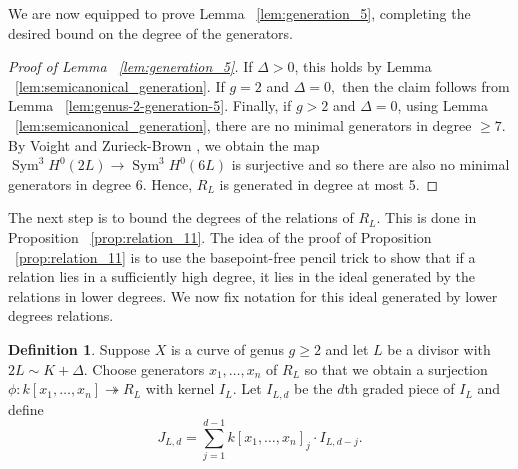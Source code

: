 \documentclass{amsart}
\theoremstyle{plain}
\theoremstyle{definition}
\newtheorem{defn}[thm]{Definition}
\theoremstyle{remark}
\numberwithin{equation}{section}
\DeclareMathOperator{\sym}{Sym}
\begin{document}
We are now equipped to prove Lemma ~\ref{lem:generation_5}, completing the desired bound on the degree of the generators.

\begin{proof}[Proof of Lemma ~\ref{lem:generation_5}]
If $\Delta > 0$, this holds by Lemma ~\ref{lem:semicanonical_generation}. If $g = 2$ and $\Delta = 0,$ then the claim follows from
Lemma ~\ref{lem:genus-2-generation-5}. Finally, if $g > 2$ and $\Delta = 0$, using Lemma ~\ref{lem:semicanonical_generation}, there are no minimal generators in degree $\geq 7$. By Voight and Zurieck-Brown \cite[Theorem 3.2.1]{vzb:stacky}, we obtain the map $\sym^3 H^0(2L) \rightarrow \sym^3 H^0(6L)$ is surjective and so there are also no minimal generators in degree 6. Hence, $R_L$ is generated in degree at most 5.
\end{proof}

The next step is to bound the degrees of the relations of $R_L$. This is done in Proposition ~\ref{prop:relation_11}. The idea of the proof of Proposition ~\ref{prop:relation_11} is to use the basepoint-free pencil trick to show that if a relation lies in a sufficiently high degree, it lies in the ideal generated by the relations in lower degrees. We now fix notation for this ideal generated by lower degrees relations.

\begin{defn}
\label{defn:lower-ideal}
Suppose $X$ is a curve of genus $g \geq 2$ and let $L$ be a divisor with $2L \sim K+\Delta$. Choose generators $x_1, \ldots, x_n$ of $R_L$ so that we obtain a surjection $\phi:k[x_1, \ldots, x_n] \twoheadrightarrow R_L$ with kernel $I_L$. Let $I_{L,d}$ be the $d$th graded piece of $I_L$ and define
$$J_{L,d} = \sum_{j = 1}^{d- 1}k[x_1, \ldots, x_n]_j \cdot I_{L,d-j}.$$
\end{defn}
\end{document}
